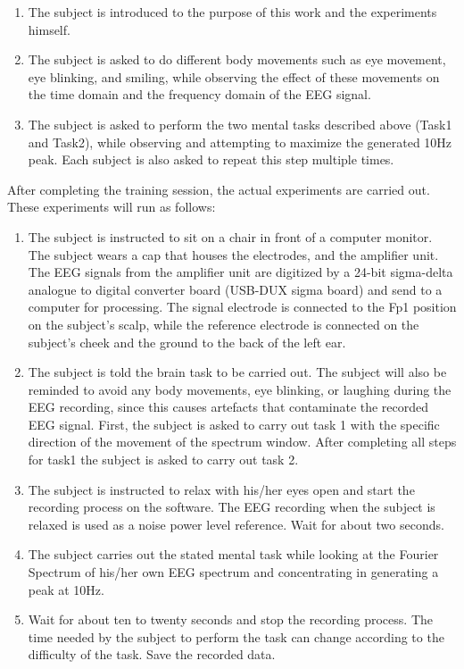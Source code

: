 \begin{enumerate}
 	\item The subject is introduced to the purpose of this work and the experiments himself. 
 	\item	The subject is asked to do different body movements such as eye movement, eye blinking, and smiling, while observing the effect of these movements on the time domain and the frequency domain of the EEG signal.  
 	\item	The subject is asked to perform the two mental tasks described above (Task1 and Task2), while observing and attempting to maximize the generated 10Hz peak. Each subject is also asked to repeat this step multiple times.
\end{enumerate}

After completing the training session, the actual experiments are carried out. These experiments will run as follows:

\begin{enumerate}
 	\item	The subject is instructed to sit on a chair in front of a computer monitor. The subject wears a cap that houses the electrodes, and the amplifier unit. The EEG signals from the amplifier unit are digitized by a 24-bit sigma-delta analogue to digital converter board (USB-DUX sigma board) and send to a computer for processing. The signal electrode is connected to the Fp1 position on the subject’s scalp, while the reference electrode is connected on the subject’s cheek and the ground to the back of the left ear. 
 	\item	The subject is told the brain task to be carried out. The subject will also be reminded to avoid any body movements, eye blinking, or laughing during the EEG recording, since this causes artefacts that contaminate the recorded EEG signal. First, the subject is asked to carry out task 1 with the specific direction of the movement of the spectrum window. After completing all steps for task1 the subject is asked to carry out task 2.
 	\item	The subject is instructed to relax with his/her eyes open and start the recording process on the software. The EEG recording when the subject is relaxed is used as a noise power level reference. Wait for about two seconds.
 	\item The subject carries out the stated mental task while looking at the Fourier Spectrum of his/her own EEG spectrum and concentrating in generating a peak at 10Hz.
 	\item Wait for about ten to twenty seconds and stop the recording process. The time needed by the subject to perform the task can change according to the difficulty of the task. Save the recorded data.
\end{enumerate}

